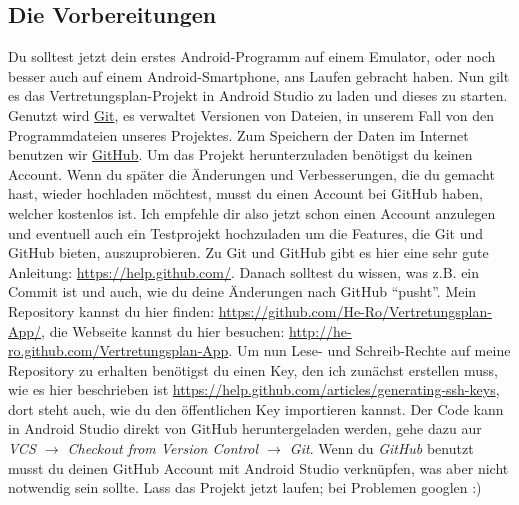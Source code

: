 \documentclass[12pt,headsepline]{scrartcl}
\begin{document}
\subsection{Die Vorbereitungen}
Du solltest jetzt dein erstes Android-Programm auf einem Emulator, oder noch besser auch auf einem Android-Smartphone, ans Laufen gebracht haben. Nun gilt es das Vertretungsplan-Projekt in Android Studio zu laden und dieses zu starten.
Genutzt wird \href{http://git-scm.com/}{Git}, es verwaltet Versionen von Dateien, in unserem Fall von den Programmdateien unseres Projektes. Zum Speichern der Daten im Internet benutzen wir \href{http://www.github.com}{GitHub}. Um das Projekt herunterzuladen benötigst du keinen Account. Wenn du später die Änderungen und Verbesserungen, die du gemacht hast, wieder hochladen möchtest, musst du einen Account bei GitHub haben, welcher kostenlos ist. Ich empfehle dir also jetzt schon einen Account anzulegen und eventuell auch ein Testprojekt hochzuladen um die Features, die Git und GitHub bieten, auszuprobieren. Zu Git und GitHub gibt es hier eine sehr gute Anleitung: \url{https://help.github.com/}. Danach solltest du wissen, was z.B. ein Commit ist und auch, wie du deine Änderungen nach GitHub ``pusht''.
Mein Repository kannst du hier finden: \url{https://github.com/He-Ro/Vertretungsplan-App/}, die Webseite kannst du hier besuchen: \url{http://he-ro.github.com/Vertretungsplan-App}.
Um nun Lese- und Schreib-Rechte auf meine Repository zu erhalten benötigst du einen Key, den ich zunächst erstellen muss, wie es hier beschrieben ist \url{https://help.github.com/articles/generating-ssh-keys}, dort steht auch, wie du den öffentlichen Key importieren kannst.
Der Code kann in Android Studio direkt von GitHub heruntergeladen werden, gehe dazu aur \textit{VCS $\rightarrow$ Checkout from Version Control $\rightarrow$ Git}. Wenn du \textit{GitHub} benutzt musst du deinen GitHub Account mit Android Studio verknüpfen, was aber nicht notwendig sein sollte.
Lass das Projekt jetzt laufen; bei Problemen googlen :)
\newpage
\end{document}
